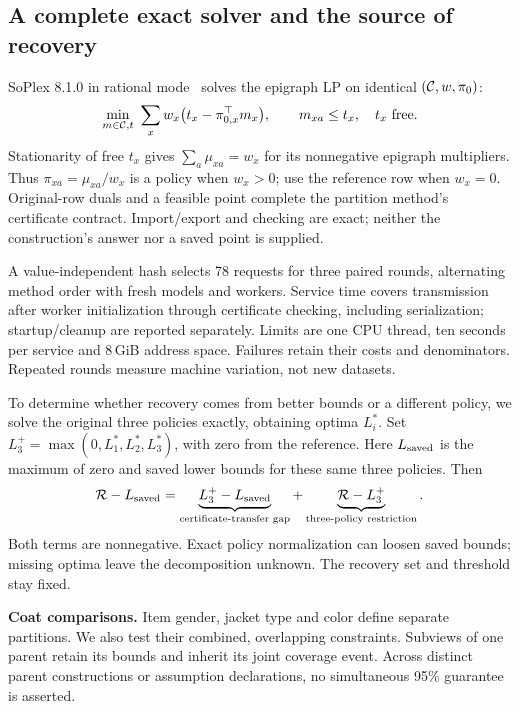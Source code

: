 \subsection{A complete exact solver and the source of recovery}
SoPlex 8.1.0 in rational mode~\cite{SoPlex2026,Gleixner2016Refinement,Gleixner2020ExactLP} solves the epigraph LP on identical $(\mathcal{C},w,\pi_0)$:
\begin{equation}
 \min_{m\in\C,t}\ \sum_xw_x\bigl(t_x-\pi_{0,x}^{\top}m_x\bigr),
 \qquad m_{xa}\le t_x,\quad t_x\text{ free}.
 \label{eq:generic-family-lp}
\end{equation}
Stationarity of free $t_x$ gives $\sum_a\mu_{xa}=w_x$ for its nonnegative epigraph multipliers. Thus $\pi_{xa}=\mu_{xa}/w_x$ is a policy when $w_x>0$; use the reference row when $w_x=0$. Original-row duals and a feasible point complete the partition method's certificate contract. Import/export and checking are exact; neither the construction's answer nor a saved point is supplied.

A value-independent hash selects 78 requests for three paired rounds, alternating method order with fresh models and workers. Service time covers transmission after worker initialization through certificate checking, including serialization; startup/cleanup are reported separately. Limits are one CPU thread, ten seconds per service and 8\,GiB address space. Failures retain their costs and denominators. Repeated rounds measure machine variation, not new datasets.

To determine whether recovery comes from better bounds or a different policy, we solve the original three policies exactly, obtaining optima $L_i^*$. Set $L_3^+=\max(0,L_1^*,L_2^*,L_3^*)$, with zero from the reference. Here $L_{\rm saved}$ is the maximum of zero and saved lower bounds for these same three policies. Then
\begin{equation}
 \mathcal R-L_{\rm saved}
 =\underbrace{L_3^+-L_{\rm saved}}_{\text{certificate-transfer gap}}
 +\underbrace{\mathcal R-L_3^+}_{\text{three-policy restriction}}.
 \label{eq:recovery-decomposition}
\end{equation}
Both terms are nonnegative. Exact policy normalization can loosen saved bounds; missing optima leave the decomposition unknown. The recovery set and threshold stay fixed.

\textbf{Coat comparisons.} Item gender, jacket type and color define separate partitions. We also test their combined, overlapping constraints. Subviews of one parent retain its bounds and inherit its joint coverage event. Across distinct parent constructions or assumption declarations, no simultaneous 95\% guarantee is asserted.
